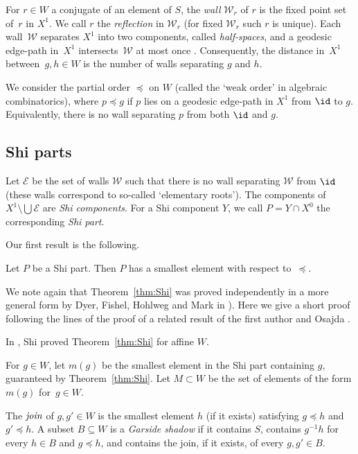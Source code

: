 For $r\in W$ a conjugate of an element of $S$, the \emph{wall}
$\mathcal W_r$ of $r$ is the fixed point set of~$r$ in $X^1$. We call $r$ the \emph{reflection} in $\mathcal W_r$ (for fixed $\mathcal W_r$ such $r$
is unique). Each wall~$\mathcal W$ separates $X^1$ into two components, called \emph{half-spaces}, and a geodesic edge-path in~$X^1$ intersects~$\mathcal W$ at most once \cite[Lem~2.5]{Ronan_2009}. Consequently, the distance in~$X^1$ between~$g,h\in W$ is the number of walls separating $g$ and $h$. 

We consider the partial order $\preceq$ on $W$ (called the `weak order' in algebraic combinatorics), where $p \preceq g$ if $p$ lies on a geodesic edge-path in $X^1$ from $\id$ to $g$. Equivalently, there is no wall separating $p$ from both $\id$ and $g$.

\subsection*{Shi parts} 

Let $\mathcal E$ be the set of walls $\mathcal W$ such that there is no wall separating $\mathcal W$ from  $\id$ (these walls correspond to so-called `elementary roots'). The components of~$X^1 \setminus \bigcup \mathcal E$ are \emph{Shi components}. For a Shi component $Y$, we call $P = Y \cap X^0$ the corresponding \emph{Shi part}.

Our first result is the following.

\begin{thm} 
	\label{thm:Shi}
	Let $P$ be a Shi part. Then $P$ has a smallest element with respect to~$\preceq$.
\end{thm}

We note again that Theorem~\ref{thm:Shi} was proved independently in a more general form by Dyer, Fishel, Hohlweg and Mark in \cite[Thm.~1.1(1)]{DHFM}). 
Here we give a short proof following the lines of the proof of a related result of the first author and Osajda \cite[Thm.~2.1]{OP}.

In \cite{Shi_1987}, Shi proved Theorem~\ref{thm:Shi} for affine $W$.

For $g\in W$, let $m(g)$ be the smallest element in the Shi part containing $g$, guaranteed by Theorem~\ref{thm:Shi}. 
Let $M\subset W$ be the set of elements of the form $m(g)$ for~$g\in W$. 

The $\emph{join}$ of $g,g'\in W$ is the smallest element $h$ (if it exists) satisfying $g\preceq h$ and~$g'\preceq h$. A subset $B\subseteq W$ is a \emph{Garside shadow} if it contains $S$, contains $g^{-1}h$ for every $h\in B$ and $g\preceq h$, and contains the join, if it exists, of every $g,g'\in B$.

